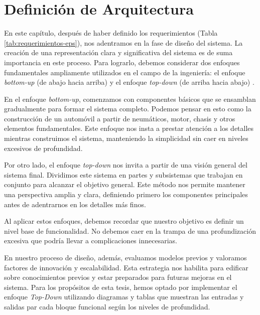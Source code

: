 \chapter{Definición de Arquitectura}

En este capítulo, después de haber definido los requerimientos (Tabla \ref{tab:requerimientos-eps}), nos adentramos en la fase de diseño del sistema. La creación de una representación clara y significativa del sistema es de suma importancia en este proceso. Para lograrlo, debemos considerar dos enfoques fundamentales ampliamente utilizados en el campo de la ingeniería: el enfoque \emph{bottom-up} (de abajo hacia arriba) y el enfoque \emph{top-down} (de arriba hacia abajo) \cite{ford2008design}.

\hspace{1.27cm}En el enfoque \emph{bottom-up}, comenzamos con componentes básicos que se ensamblan gradualmente para formar el sistema completo. Podemos pensar en esto como la construcción de un automóvil a partir de neumáticos, motor, chasis y otros elementos fundamentales. Este enfoque nos insta a prestar atención a los detalles mientras construimos el sistema, manteniendo la simplicidad sin caer en niveles excesivos de profundidad.

\hspace{1.27cm}Por otro lado, el enfoque \emph{top-down} nos invita a partir de una visión general del sistema final. Dividimos este sistema en partes y subsistemas que trabajan en conjunto para alcanzar el objetivo general. Este método nos permite mantener una perspectiva amplia y clara, definiendo primero los componentes principales antes de adentrarnos en los detalles más finos.

\hspace{1.27cm}Al aplicar estos enfoques, debemos recordar que nuestro objetivo es definir un nivel base de funcionalidad. No debemos caer en la trampa de una profundización excesiva que podría llevar a complicaciones innecesarias. 

\hspace{1.27cm}En nuestro proceso de diseño, además, evaluamos modelos previos y valoramos factores de innovación y escalabilidad. Esta estrategia nos habilita para edificar sobre conocimientos previos y estar preparados para futuras mejoras en el sistema. Para los propósitos de esta tesis, hemos optado por implementar el enfoque \emph{Top-Down} utilizando diagramas y tablas que muestran las entradas y salidas par cada bloque funcional según los niveles de profundidad.
\newpage


